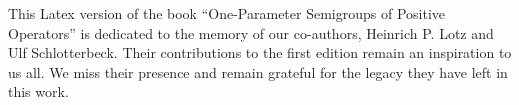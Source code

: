 %
%

\begin{dedication}
{\RaggedRight\Large This Latex version of the book \enquote{\textrm{One-Parameter Semigroups of Positive Operators}} is dedicated to the memory of our co-authors, Heinrich P. Lotz and Ulf Schlotterbeck. 
Their contributions to the first edition remain an inspiration to us all. We  miss their presence and remain grateful for the legacy they have left in this work.}
\end{dedication}




